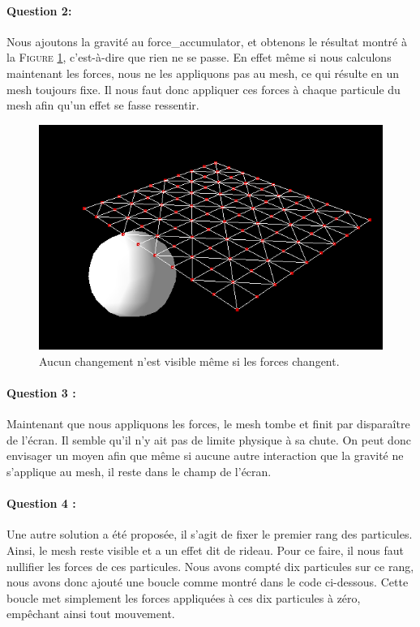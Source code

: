 \documentclass[a4paper,12pt]{article}
\begin{document}
\paragraph{Question 2:} Nous ajoutons la gravité au \og{}force\_accumulator\fg{}, et obtenons le résultat montré à la \textsc{Figure} \ref{fig:q2}, c'est-à-dire que rien ne se passe. En effet même si nous calculons maintenant les forces, nous ne les appliquons pas au mesh, ce qui résulte en un mesh toujours fixe. Il nous faut donc appliquer ces forces à chaque particule du mesh afin qu'un effet se fasse ressentir.
\begin{figure}[ht!]
  \centering
  \includegraphics[width=\textwidth]{images/q2.png}
  \caption{Aucun changement n'est visible même si les forces changent.}
  \label{fig:q2}
\end{figure}

\paragraph{Question 3 :} Maintenant que nous appliquons les forces, le mesh tombe et finit par disparaître de l'écran. Il semble qu'il n'y ait pas de limite physique à sa chute. On peut donc envisager un moyen afin que même si aucune autre interaction que la gravité ne s'applique au mesh, il reste dans le champ de l'écran.

\paragraph{Question 4 :} Une autre solution a été proposée, il s'agit de fixer le premier rang des particules. Ainsi, le mesh reste visible et a un effet dit \og{}de rideau\fg{}. Pour ce faire, il nous faut nullifier les forces de ces particules. Nous avons compté dix particules sur ce rang, nous avons donc ajouté une boucle comme montré dans le code ci-dessous. Cette boucle met simplement les forces appliquées à ces dix particules à zéro, empêchant ainsi tout mouvement.
\end{document}
